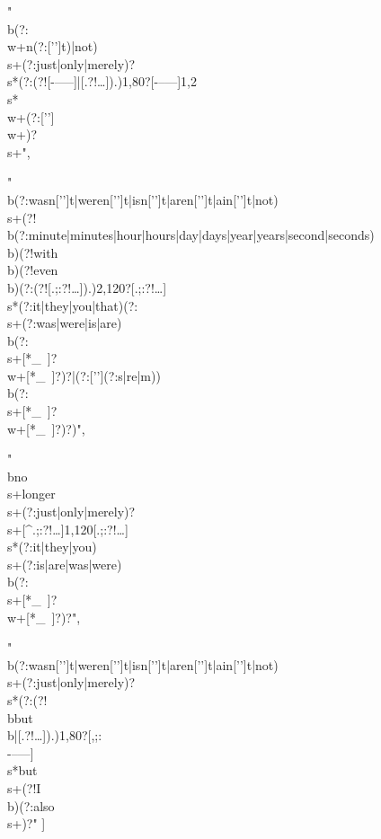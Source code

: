 \documentclass[11pt]{article}
\begin{document}
\begin{cfgblock}
  "\\b(?:\\w+n(?:['’]t)|not)\\s+(?:just|only|merely)?\\s*(?:(?![-–—]|[.?!…]).){1,80}?[-–—]{1,2}\\s*\\w+(?:['’]\\w+)?\\s+",

  "\\b(?:wasn['’]t|weren['’]t|isn['’]t|aren['’]t|ain['’]t|not)\\s+(?!\\b(?:minute|minutes|hour|hours|day|days|year|years|second|seconds)\\b)(?!with\\b)(?!even\\b)(?:(?![.;:?!…]).){2,120}?[.;:?!…]\\s*(?:it|they|you|that)(?:\\s+(?:was|were|is|are)\\b(?:\\s+[*_~]?\\w+[*_~]?)?|(?:['’](?:s|re|m))\\b(?:\\s+[*_~]?\\w+[*_~]?)?)",

  "\\bno\\s+longer\\s+(?:just|only|merely)?\\s+[^.;:?!…]{1,120}[.;:?!…]\\s*(?:it|they|you)\\s+(?:is|are|was|were)\\b(?:\\s+[*_~]?\\w+[*_~]?)?",

  "\\b(?:wasn['’]t|weren['’]t|isn['’]t|aren['’]t|ain['’]t|not)\\s+(?:just|only|merely)?\\s*(?:(?!\\bbut\\b|[.?!…]).){1,80}?[,;:\\-–—]\\s*but\\s+(?!I\\b)(?:also\\s+)?"
]
\end{cfgblock}
\end{document}
